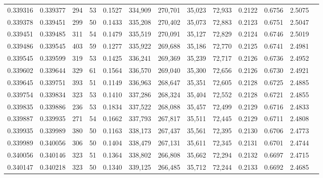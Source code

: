 \begin{tabular}{rrrrrrrrrrrrr}
0.339316 & 0.339377 &   294 &  53 &                                     0.1527 & 334,909 & 270,701 &  35,023 &  72,933 & 0.2122 & 0.6756 & 2.5075 \\
0.339378 & 0.339451 &   299 &  50 &                                     0.1433 & 335,208 & 270,402 &  35,073 &  72,883 & 0.2123 & 0.6751 & 2.5047 \\
0.339451 & 0.339485 &   311 &  54 &                                     0.1479 & 335,519 & 270,091 &  35,127 &  72,829 & 0.2124 & 0.6746 & 2.5019 \\
0.339486 & 0.339545 &   403 &  59 &                                     0.1277 & 335,922 & 269,688 &  35,186 &  72,770 & 0.2125 & 0.6741 & 2.4981 \\
0.339545 & 0.339599 &   319 &  53 &                                     0.1425 & 336,241 & 269,369 &  35,239 &  72,717 & 0.2126 & 0.6736 & 2.4952 \\
0.339602 & 0.339644 &   329 &  61 &                                     0.1564 & 336,570 & 269,040 &  35,300 &  72,656 & 0.2126 & 0.6730 & 2.4921 \\
0.339645 & 0.339751 &   393 &  51 &                                     0.1149 & 336,963 & 268,647 &  35,351 &  72,605 & 0.2128 & 0.6725 & 2.4885 \\
0.339754 & 0.339834 &   323 &  53 &                                     0.1410 & 337,286 & 268,324 &  35,404 &  72,552 & 0.2128 & 0.6721 & 2.4855 \\
0.339835 & 0.339886 &   236 &  53 &                                     0.1834 & 337,522 & 268,088 &  35,457 &  72,499 & 0.2129 & 0.6716 & 2.4833 \\
0.339887 & 0.339935 &   271 &  54 &                                     0.1662 & 337,793 & 267,817 &  35,511 &  72,445 & 0.2129 & 0.6711 & 2.4808 \\
0.339935 & 0.339989 &   380 &  50 &                                     0.1163 & 338,173 & 267,437 &  35,561 &  72,395 & 0.2130 & 0.6706 & 2.4773 \\
0.339989 & 0.340056 &   306 &  50 &                                     0.1404 & 338,479 & 267,131 &  35,611 &  72,345 & 0.2131 & 0.6701 & 2.4744 \\
0.340056 & 0.340146 &   323 &  51 &                                     0.1364 & 338,802 & 266,808 &  35,662 &  72,294 & 0.2132 & 0.6697 & 2.4715 \\
0.340147 & 0.340218 &   323 &  50 &                                     0.1340 & 339,125 & 266,485 &  35,712 &  72,244 & 0.2133 & 0.6692 & 2.4685 \\

\end{tabular}
